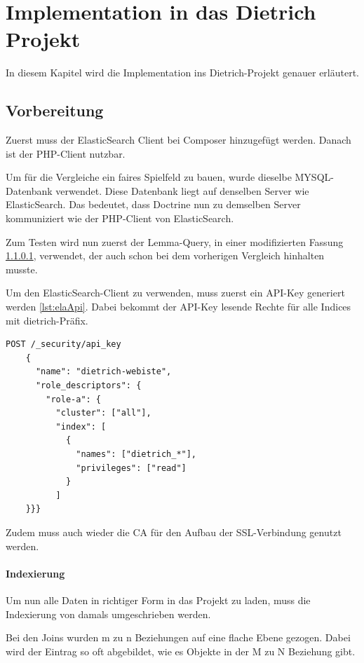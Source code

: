 \chapter{Implementation in das Dietrich Projekt}

In diesem Kapitel wird die Implementation ins Dietrich-Projekt genauer erläutert.

\section{Vorbereitung}

Zuerst muss der ElasticSearch Client bei Composer hinzugefügt werden. Danach ist der PHP-Client nutzbar. 

Um für die Vergleiche ein faires Spielfeld zu bauen, wurde dieselbe MYSQL-Datenbank verwendet. Diese Datenbank liegt auf denselben Server wie ElasticSearch. Das bedeutet, dass Doctrine nun zu demselben Server kommuniziert wie der PHP-Client von ElasticSearch.

Zum Testen wird nun zuerst der Lemma-Query, in einer modifizierten Fassung \ref{lemmaIndexierungEla}, verwendet, der auch schon bei dem vorherigen Vergleich hinhalten musste.

Um den ElasticSearch-Client zu verwenden, muss zuerst ein API-Key generiert werden \ref{lst:elaApi}. Dabei bekommt der API-Key lesende Rechte für alle Indices mit dietrich-Präfix. 

\begin{lstlisting}[language=XML, frame=single, label={lst:elaApi}] 
    POST /_security/api_key
    {
      "name": "dietrich-webiste",
      "role_descriptors": { 
        "role-a": {
          "cluster": ["all"],
          "index": [
            {
              "names": ["dietrich_*"],
              "privileges": ["read"]
            }
          ]
    }}}
\end{lstlisting}

Zudem muss auch wieder die CA für den Aufbau der SSL-Verbindung genutzt werden.


\subsubsection{Indexierung}
\label{lemmaIndexierungEla}

Um nun alle Daten in richtiger Form in das Projekt zu laden, muss die Indexierung von damals umgeschrieben werden. 

Bei den Joins wurden m zu n Beziehungen auf eine flache Ebene gezogen. Dabei wird der Eintrag so oft abgebildet, wie es Objekte in der M zu N Beziehung gibt. 

